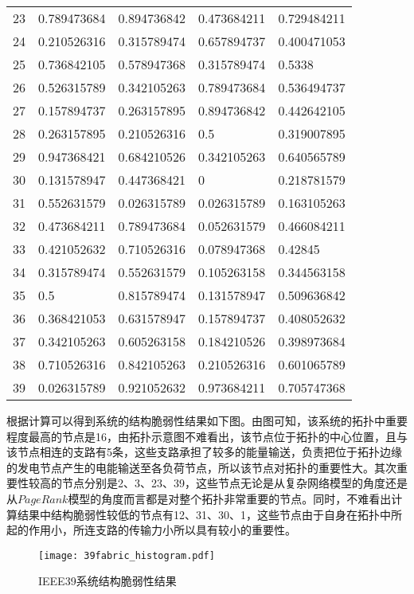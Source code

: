 \begin{table}[H]
\begin{tabular}{C{1.5cm}C{2.75cm}C{2.75cm}C{2.75cm}C{2.75cm}}
23 & 0.789473684 & 0.894736842 & 0.473684211 & 0.729484211 \\
24 & 0.210526316 & 0.315789474 & 0.657894737 & 0.400471053 \\
25 & 0.736842105 & 0.578947368 & 0.315789474 & 0.5338      \\
26 & 0.526315789 & 0.342105263 & 0.789473684 & 0.536494737 \\
27 & 0.157894737 & 0.263157895 & 0.894736842 & 0.442642105 \\
28 & 0.263157895 & 0.210526316 & 0.5         & 0.319007895 \\
29 & 0.947368421 & 0.684210526 & 0.342105263 & 0.640565789 \\
30 & 0.131578947 & 0.447368421 & 0           & 0.218781579 \\
31 & 0.552631579 & 0.026315789 & 0.026315789 & 0.163105263 \\
32 & 0.473684211 & 0.789473684 & 0.052631579 & 0.466084211 \\
33 & 0.421052632 & 0.710526316 & 0.078947368 & 0.42845     \\
34 & 0.315789474 & 0.552631579 & 0.105263158 & 0.344563158 \\
35 & 0.5         & 0.815789474 & 0.131578947 & 0.509636842 \\
36 & 0.368421053 & 0.631578947 & 0.157894737 & 0.408052632 \\
37 & 0.342105263 & 0.605263158 & 0.184210526 & 0.398973684 \\
38 & 0.710526316 & 0.842105263 & 0.210526316 & 0.601065789 \\
39 & 0.026315789 & 0.921052632 & 0.973684211 & 0.705747368 \\
\bottomrule
\end{tabular}
\end{table}

根据计算可以得到系统的结构脆弱性结果如下图。由图可知，该系统的拓扑中重要程度最高的节点是16，由拓扑示意图不难看出，该节点位于拓扑的中心位置，且与该节点相连的支路有5条，这些支路承担了较多的能量输送，负责把位于拓扑边缘的发电节点产生的电能输送至各负荷节点，所以该节点对拓扑的重要性大。其次重要性较高的节点分别是2、3、23、39，这些节点无论是从复杂网络模型的角度还是从$PageRank$模型的角度而言都是对整个拓扑非常重要的节点。同时，不难看出计算结果中结构脆弱性较低的节点有12、31、30、1，这些节点由于自身在拓扑中所起的作用小，所连支路的传输力小所以具有较小的重要性。
\begin{figure}[H] %
  \centering
  \texttt{[image: 39fabric\_histogram.pdf]}
  \caption{IEEE39系统结构脆弱性结果}
  \label{fig:39fabric_histogram}
\end{figure}

